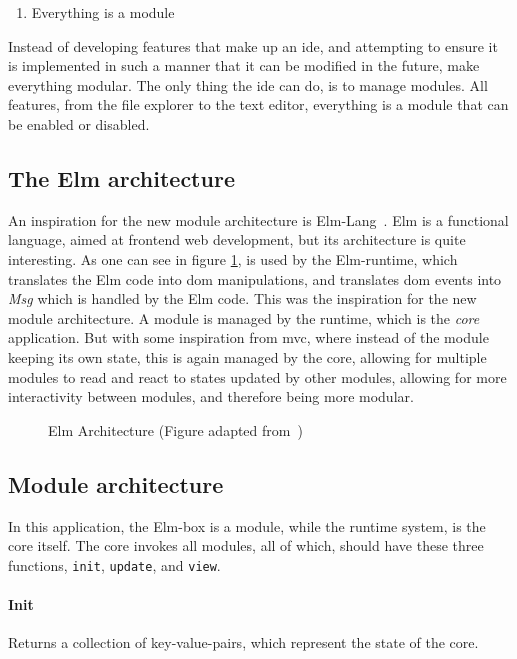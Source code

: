\begin{enumerate}
  \item Everything is a module
\end{enumerate}

Instead of developing features that make up an \gls*{ide}, and attempting to
ensure it is implemented in such a manner that it can be modified in the future,
make everything modular. The only thing the \gls*{ide} can do, is to manage
modules. All features, from the file explorer to the text editor, everything is
a module that can be enabled or disabled.

\subsection{The Elm architecture}

An inspiration for the new module architecture is Elm-Lang~\cite{elmLang}. Elm
is a functional language, aimed at frontend web development, but its
architecture is quite interesting. As one can see in figure
\ref{fig:elmArchitecture}, is used by the Elm-runtime, which translates the Elm
code into \gls*{dom} manipulations, and translates \gls*{dom} events into
\textit{Msg} which is handled by the Elm code. This was the inspiration for the
new module architecture. A module is managed by the runtime, which is the
\textit{core} application. But with some inspiration from \gls*{mvc}, where
instead of the module keeping its own state, this is again managed by the core,
allowing for multiple modules to read and react to states updated by other
modules, allowing for more interactivity between modules, and therefore being
more modular.

\begin{figure}
  \centering
  
  \caption{Elm Architecture (Figure adapted from~\cite{elmFig})}
  \label{fig:elmArchitecture}
\end{figure}

\subsection{Module architecture}

In this application, the Elm-box is a module, while the runtime system, is the
core itself. The core invokes all modules, all of which, should have these three
functions, \lstinline{init}, \lstinline{update}, and \lstinline{view}.

\paragraph{Init} Returns a collection of key-value-pairs, which represent
the state of the core.

